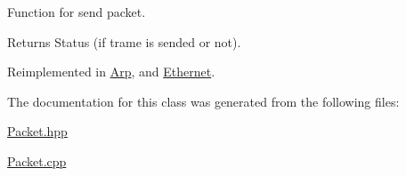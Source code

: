 Function for send packet. 

\begin{DoxyReturn}{Returns}
Status (if trame is sended or not). 
\end{DoxyReturn}


Reimplemented in \hyperlink{class_arp_ab636211e774eb61e3eaa890a11145aee}{Arp}, and \hyperlink{class_ethernet_a07e05248b744e5b156a21c110dd6777c}{Ethernet}.



The documentation for this class was generated from the following files\-:\begin{DoxyCompactItemize}
\item 
\hyperlink{_packet_8hpp}{Packet.\-hpp}\item 
\hyperlink{_packet_8cpp}{Packet.\-cpp}\end{DoxyCompactItemize}
